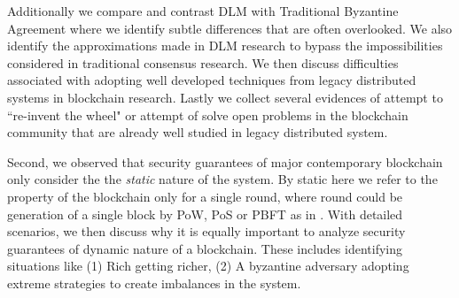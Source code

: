 Additionally we compare and contrast DLM with Traditional Byzantine Agreement \cite{lamport1982byzantine} where we identify subtle differences that are often overlooked. We also identify the approximations made in DLM research to bypass the impossibilities considered in traditional consensus research. We then discuss difficulties associated with adopting well developed techniques from legacy distributed systems in blockchain research. Lastly we collect several evidences of attempt to ``re-invent the wheel" or attempt of solve open problems in the blockchain community that are already well studied in legacy distributed system. 





Second, we observed that security guarantees of major contemporary blockchain only consider the the {\em static} nature of the system. 
By static here we refer to the property of the blockchain only for a single round, where round could be generation of a single block by PoW, PoS or PBFT as in \cite{gervais2016security}. 
With detailed scenarios, we then discuss why it is equally important to analyze security guarantees of dynamic nature of a blockchain. These includes identifying situations like (1) Rich getting richer, (2) A byzantine adversary adopting extreme strategies to create imbalances in the system.  


